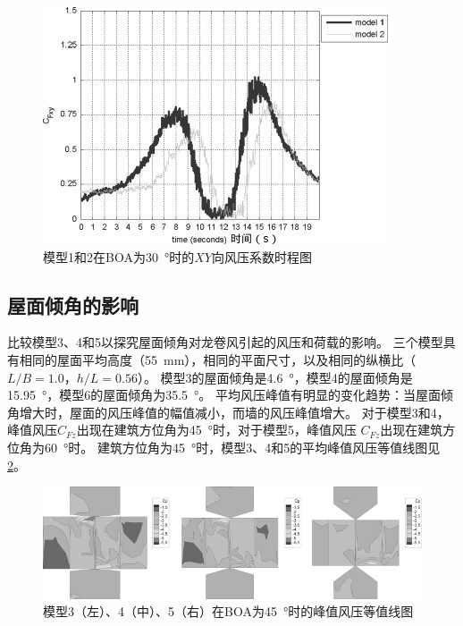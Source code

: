 \documentclass{ctexart}
\begin{document}
\begin{figure}[h]
\centering
\includegraphics{./fig/6.jpg}
\caption{模型1和2在BOA为\SI{30}{\degree}时的$XY$向风压系数时程图}
\label{fig:Cfxy}
\end{figure}

\subsection{屋面倾角的影响}
比较模型3、4和5以探究屋面倾角对龙卷风引起的风压和荷载的影响。
三个模型具有相同的屋面平均高度（\SI{55}{mm}），相同的平面尺寸，以及相同的纵横比（$L/B=1.0$，$h/L=0.56$）。
模型3的屋面倾角是\SI{4.6}{\degree}，模型4的屋面倾角是\SI{15.95}{\degree}，模型6的屋面倾角为\SI{35.5}{\degree}。
平均风压峰值有明显的变化趋势：当屋面倾角增大时，屋面的风压峰值的幅值减小，而墙的风压峰值增大。
对于模型3和4，峰值风压$C_{Fz}$出现在建筑方位角为\SI{45}{\degree}时，对于模型5，峰值风压 $C_{Fz}$出现在建筑方位角为\SI{60}{\degree}时。
建筑方位角为\SI{45}{\degree}时，模型3、4和5的平均峰值风压等值线图见\ref{fig:p-pitch}。
\begin{figure}[h]
\centering
\includegraphics{./fig/7.jpg}
\caption{模型3（左）、4（中）、5（右）在BOA为\SI{45}{\degree}时的峰值风压等值线图}
\label{fig:p-pitch}
\end{figure}
\end{document}
